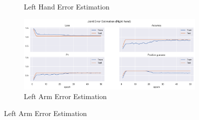 \begin{figure}[!htbp]
\begin{subfigure}[b]{0.47\linewidth}
        \caption{Left Hand Error Estimation}
        \label{fig:v2_leha_jt_ee}
    \end{subfigure}
    \hfill
    \begin{subfigure}[b]{0.47\linewidth}
        \centering
        \includegraphics[width=\textwidth]{figures/Results/v2/jt/Right hand_ErrorEstimation.png}
        \caption{Left Arm Error Estimation}
        \label{fig:v2_riha_jt_ee}
    \end{subfigure}
  \end{figure}
  
